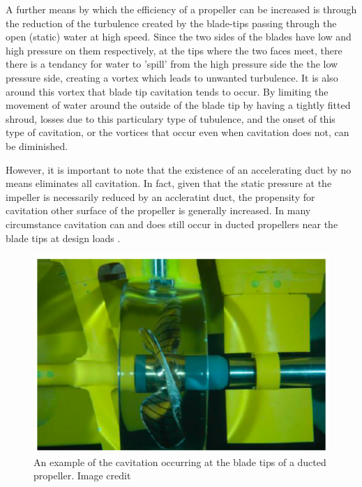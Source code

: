 \documentclass{article}\usepackage[]{graphicx}\usepackage[]{color}
\begin{document}
A further means by which the efficiency of a propeller can be increased is through the reduction of the turbulence created by the blade-tips passing through the open (static) water at high speed.  Since the two sides of the blades have low and high pressure on them respectively, at the tips where the two faces meet, there there is a tendancy for water to 'spill' from the high pressure side the the low pressure side, creating a vortex which leads to unwanted turbulence.  It is also around this vortex that blade tip cavitation tends to occur. By limiting the movement of water around the outside of the blade tip by having a tightly fitted shroud, losses due to this particulary type of tubulence, and the onset of this type of cavitation, or the vortices that occur even when cavitation does not, can be diminished.

However, it is important to note that the existence of an accelerating duct by no means eliminates all cavitation.  In fact, given that the static pressure at the impeller is necessarily reduced by an accleratint duct, the propensity for cavitation other surface of the propeller is generally increased.  In many circumstance cavitation can and does still occur in ducted propellers near the blade tips at design loads \parencite{moulijn2015}.

\begin{figure}
\includegraphics[width=\textwidth]{CavitatingDuct.png}
\caption{An example of the cavitation occurring at the blade tips of a ducted propeller. Image credit \cite{moulijn2015}}
\label{fig:CavitatingDuct.png}
\end{figure}
\end{document}
